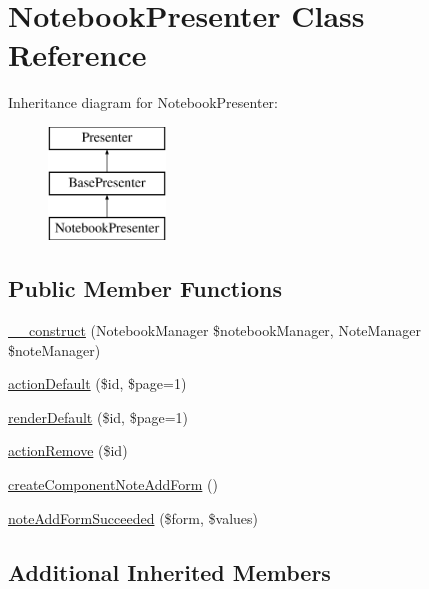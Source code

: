 \hypertarget{class_app_1_1_presenters_1_1_notebook_presenter}{}\section{Notebook\+Presenter Class Reference}
\label{class_app_1_1_presenters_1_1_notebook_presenter}
Inheritance diagram for Notebook\+Presenter\+:\begin{figure}[H]
\begin{center}
\leavevmode
\includegraphics[height=3.000000cm]{class_app_1_1_presenters_1_1_notebook_presenter}
\end{center}
\end{figure}
\subsection*{Public Member Functions}
\begin{DoxyCompactItemize}
\item 
\mbox{\hyperlink{class_app_1_1_presenters_1_1_notebook_presenter_abf10af0e00d40379ce44c79183832689}{\+\_\+\+\_\+construct}} (Notebook\+Manager \$notebook\+Manager, Note\+Manager \$note\+Manager)
\item 
\mbox{\hyperlink{class_app_1_1_presenters_1_1_notebook_presenter_a3b0019dbdf5a7e4547275d3be02e1f7d}{action\+Default}} (\$id, \$page=1)
\item 
\mbox{\hyperlink{class_app_1_1_presenters_1_1_notebook_presenter_a0abea8519a466f30d4fe2a7b9e2872f8}{render\+Default}} (\$id, \$page=1)
\item 
\mbox{\hyperlink{class_app_1_1_presenters_1_1_notebook_presenter_ab7e4d6093e671c38971e19e7a45f322b}{action\+Remove}} (\$id)
\item 
\mbox{\hyperlink{class_app_1_1_presenters_1_1_notebook_presenter_a43f32165e9c04e87af5d78509076ea53}{create\+Component\+Note\+Add\+Form}} ()
\item 
\mbox{\hyperlink{class_app_1_1_presenters_1_1_notebook_presenter_af4e4ada78cf634f26140f658dc710c06}{note\+Add\+Form\+Succeeded}} (\$form, \$values)
\end{DoxyCompactItemize}
\subsection*{Additional Inherited Members}


